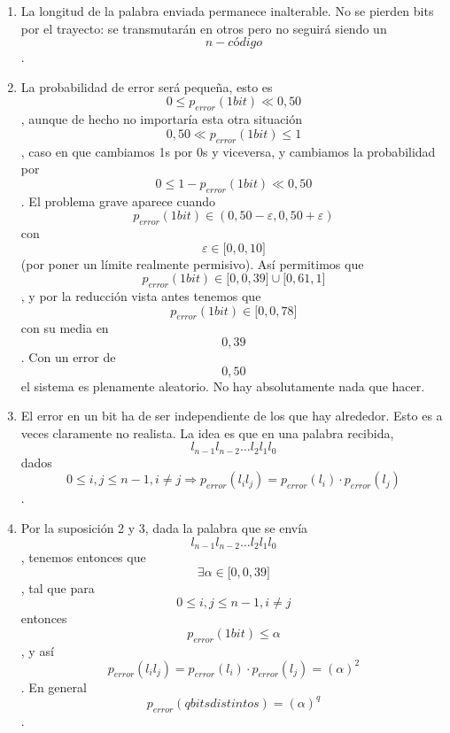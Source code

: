 \begin{enumerate}
\begin{enumerate}
\begin{enumerate}
      \begin{enumerate}
      \def\labelenumiv{\arabic{enumiv}.}
      \tightlist
      \item
        La longitud de la palabra enviada permanece inalterable. No se
        pierden bits por el trayecto: se transmutarán en otros pero no
        seguirá siendo un \[n - \mathit{código}\].
      \item
        La probabilidad de error será pequeña, esto
        es\[{0 \leq p_{\mathit{error}}}{{({1\mathit{bit}})} \ll 0,50}\],
        aunque de hecho no importaría esta otra
        situación\[{0,50 \ll p_{\mathit{error}}}{{({1\mathit{bit}})} \leq 1}\],
        caso en que cambiamos 1s por 0s y viceversa, y cambiamos la
        probabilidad por
        \[{0 \leq {1 - p_{\mathit{error}}}}{{({1\mathit{bit}})} \ll 0,50}\].
        El problema grave aparece cuando
        \[p_{\mathit{error}}{{({1\mathit{bit}})} \in \left( {{0,50 - \varepsilon},{0,50 + \varepsilon}} \right)}\]
        con \[\varepsilon \in {\lbrack{0,0,10}\rbrack}\](por poner un
        límite real\-mente permisivo). Así permitimos
        que\[p_{\mathit{error}}{{({1\mathit{bit}})} \in {{\lbrack{0,0,39}\rbrack} \cup {\lbrack{0,61,1}\rbrack}}}\],
        y por la reducción vista antes tenemos que
        \[p_{\mathit{error}}{{({1\mathit{bit}})} \in {\lbrack{0,0,78}\rbrack}}\]con
        su media en \[0,39\]. Con un error de \[0,50\]el sistema es
        plenamente aleatorio. No hay absolutamente nada que hacer.
      \item
        El error en un bit ha de ser independiente de los que hay
        alrededor. Esto es a ve\-ces claramente no realista. La idea es
        que en una palabra recibida,
        \[l_{n - 1}l_{n - 2}\ldots l_{2}l_{1}l_{0}\]dados
        \[{0 \leq i},{j \leq {n - 1}},{i \neq j}\Rightarrow p_{\mathit{error}}{{({l_{i}l_{j}})} = p_{\mathit{error}}}{{(l_{i})} \cdot p_{\mathit{error}}}{(l_{j})}\].
      \item
        Por la suposición 2 y 3, dada la palabra que se envía
        \[l_{n - 1}l_{n - 2}\ldots l_{2}l_{1}l_{0}\], tene\-mos entonces
        que \[\exists{\alpha \in {\lbrack{0,0,39}\rbrack}}\], tal que
        para \[{0 \leq i},{j \leq {n - 1}},{i \neq j}\] entonces
        \[p_{\mathit{error}}{{({1\mathit{bit}})} \leq \alpha}\], y así
        \[p_{\mathit{error}}{{({l_{i}l_{j}})} = p_{\mathit{error}}}{{(l_{i})} \cdot p_{\mathit{error}}}{{(l_{j})} = {(\alpha)}^{2}}\].
        En general
        \[p_{\mathit{error}}{\left( {q\mathit{bits}\mathit{distintos}} \right) = \left( \alpha \right)^{q}}\].

\end{enumerate}
\end{enumerate}
\end{enumerate}
\end{enumerate}
